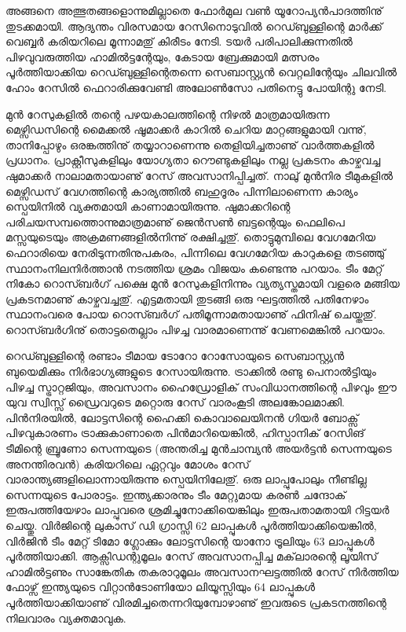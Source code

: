 ﻿
\vskip 2pt

അങ്ങനെ അത്ഭുതങ്ങളൊന്നുമില്ലാതെ ഫോര്‍മുല വണ്‍ യൂറോപ്യന്‍പാദത്തിനു് തുടക്കമായി. ആദ്യന്തം 
വിരസമായ റേസിനൊടുവില്‍ റെഡ്ബുള്ളിന്റെ മാര്‍ക്ക് വെബ്ബര്‍ കരിയറിലെ മൂന്നാമതു് കിരീടം നേടി. 
ടയര്‍ പരിപാലിക്കുന്നതില്‍ പിഴവുവരുത്തിയ ഹാമില്‍ട്ടന്റേയും, കേടായ ബ്രേക്കുമായി മത്സരം 
പൂര്‍ത്തിയാക്കിയ റെഡ്ബുള്ളിന്റെതന്നെ സെബാസ്റ്റ്യന്‍ വെറ്റലിന്റേയും ചിലവില്‍ ഹോം റേസില്‍ 
ഫെറാരിക്കുവേണ്ടി അലോണ്‍സോ പതിനെട്ടു പോയിന്റു നേടി.

മുന്‍ റേസുകളില്‍ തന്റെ പഴയകാലത്തിന്റെ നിഴല്‍ മാത്രമായിരുന്ന മെഴ്സിഡസിന്റെ മൈക്കല്‍ ഷൂമാക്കര്‍ 
കാറില്‍ ചെറിയ മാറ്റങ്ങളുമായി വന്നു്, താനിപ്പോഴും ഒരങ്കത്തിനു് തയ്യാറാണെന്നു തെളിയിച്ചതാണു് 
വാര്‍ത്തകളില്‍ പ്രധാനം. പ്രാക്റ്റീസുകളിലും യോഗ്യതാ റൌണ്ടുകളിലും നല്ല പ്രകടനം കാഴ്ചവച്ച ഷുമാക്കര്‍ 
നാലാമതായാണു് റേസ് അവസാനിപ്പിച്ചത്. നാലു് മുന്‍നിര ടീമുകളില്‍ മെഴ്സിഡസ് വേഗത്തിന്റെ കാര്യത്തില്‍ 
ബഹുദൂരം പിന്നിലാണെന്ന കാര്യം സ്പെയിനില്‍ വ്യക്തമായി കാണാമായിരുന്നു. ഷുമാക്കറിന്റെ 
പരിചയസമ്പത്തൊന്നുമാത്രമാണു് ജെന്‍സണ്‍ ബട്ടന്റെയും ഫെലിപെ മസ്സയുടെയും അക്രമണങ്ങളില്‍നിന്നു് 
രക്ഷിച്ചതു്. തൊട്ടുമുമ്പിലെ വേഗമേറിയ ഫെറാരിയെ നേരിടുന്നതിനുപകരം, പിന്നിലെ വേഗമേറിയ കാറുകളെ 
തടഞ്ഞു് സ്ഥാനംനിലനിര്‍ത്താന്‍ നടത്തിയ ശ്രമം വിജയം കണ്ടെന്നു പറയാം. ടീം മേറ്റ് നികോ റൊസ്ബര്‍ഗ് 
പക്ഷെ മുന്‍ റേസുകളിനിന്നും വ്യത്യസ്തമായി വളരെ മങ്ങിയ പ്രകടനമാണു് കാഴ്ചവച്ചതു്. എട്ടമതായി തുടങ്ങി 
ഒരു ഘട്ടത്തില്‍ പതിനേഴാം സ്ഥാനംവരെ പോയ റൊസ്ബര്‍ഗ് പതിമൂന്നാമതായാണു് ഫിനിഷ് ചെയ്തതു്. 
റൊസ്ബര്‍ഗിനു് തൊട്ടതെല്ലാം പിഴച്ച വാരമാണെന്നു് വേണമെങ്കില്‍ പറയാം.

റെഡ്ബുള്ളിന്റെ രണ്ടാം ടീമായ ടോറോ റോസോയുടെ സെബാസ്റ്റ്യന്‍ ബുയെമിക്കും നിര്‍ഭാഗ്യങ്ങളുടെ റേസായിരുന്നു. 
ട്രാക്കില്‍ രണ്ടു പെനാല്‍ട്ടിയും പിഴച്ച സ്ട്രാറ്റജിയും, അവസാനം ഹൈഡ്രോളിക് സംവിധാനത്തിന്റെ പിഴവും ഈ യുവ 
സ്വിസ്സ് ഡ്രൈവറുടെ മറ്റൊരു റേസ് വാരംകൂടി അലങ്കോലമാക്കി. പിന്‍നിരയില്‍, ലോട്ടസിന്റെ ഹൈക്കി 
കൊവാലെയിനന്‍ ഗിയര്‍ ബോക്സ് പിഴവുകാരണം ട്രാക്കുകാണാതെ പിന്‍മാറിയെങ്കില്‍, ഹിസ്പാനിക് റേസിങ് ടീമിന്റെ 
ബ്രൂണോ സെന്നയുടെ (അന്തരിച്ച മുന്‍ചാമ്പ്യന്‍ അയര്‍ട്ടന്‍ സെന്നയുടെ അനന്തിരവന്‍) കരിയറിലെ ഏറ്റവും മോശം 
റേസ് വാരാന്ത്യങ്ങളിലൊന്നായിരുന്നു സ്പെയിനിലേതു്. ഒരു ലാപ്പുപോലും നീണ്ടില്ല സെന്നയുടെ പോരാട്ടം. ഇന്ത്യക്കാരനും 
ടീം മേറ്റുമായ കരണ്‍ ചന്ദോക് ഇരുപത്തിയേഴാം ലാപ്പുവരെ ശ്രമിച്ചുനോക്കിയെങ്കിലും ഇരുപതാമതായി റിട്ടയര്‍ ചെയ്തു. 
വിര്‍ജിന്റെ ലുകാസ് ഡി ഗ്രാസ്സി 62 ലാപ്പുകള്‍ പൂര്‍ത്തിയാക്കിയെങ്കില്‍, വിര്‍ജിന്‍ ടീം മേറ്റ് ടിമോ ഗ്ലോക്കും ലോട്ടസിന്റെ 
യാനോ ട്രൂലിയും 63 ലാപ്പുകള്‍ പൂര്‍ത്തിയാക്കി. ആക്സിഡന്റുമൂലം റേസ് അവസാനപ്പിച്ച മക്‌ലാരന്റെ ലൂയിസ് 
ഹാമില്‍ട്ടണും സാങ്കേതിക തകരാറുമൂലം അവസാനഘട്ടത്തില്‍ റേസ് നിര്‍ത്തിയ ഫോഴ്സ് ഇന്ത്യയുടെ വിറ്റാന്‍ടോണിയോ 
ലിയൂസ്സിയും 64 ലാപ്പുകള്‍ പൂര്‍ത്തിയാക്കിയാണു് വിരമിച്ചതെന്നറിയുമ്പോഴാണു് ഇവരുടെ പ്രകടനത്തിന്റെ നിലവാരം 
വ്യക്തമാവുക.

